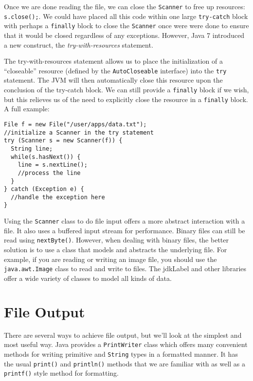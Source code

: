 Once we are done reading the file, we can close the 
\texttt{Scanner} to free up resources:
\texttt{s.close();}.  We could have placed
all this code within one large \texttt{try-catch}
block with perhaps a \texttt{finally} block
to close the \texttt{Scanner} once were were
done to ensure that it would be closed regardless of
any exceptions.  However, Java 7 introduced a new 
construct, the \emph{try-with-resources} statement.

The  try-with-resources statement 
allows us to place
the initialization of a ``closeable'' resource (defined
by the \texttt{AutoCloseable} interface) into
the \texttt{try} statement.  The JVM will then
automatically close this resource upon the conclusion of
the try-catch block.  We can still provide
a \texttt{finally} block if we wish, but this 
relieves us of the need to explicitly close the resource
in a \texttt{finally} block.  A full example:

\begin{verbatim}
File f = new File("/user/apps/data.txt");
//initialize a Scanner in the try statement
try (Scanner s = new Scanner(f)) {
  String line;
  while(s.hasNext()) {
    line = s.nextLine();
	//process the line
  }
} catch (Exception e) {
  //handle the exception here
}
\end{verbatim}

Using the \texttt{Scanner} class to do file 
input offers a more abstract interaction with a file.  
It also uses a buffered input stream for performance.
Binary files can still be read using \texttt{nextByte()}.
However, when dealing with binary files, the better 
solution is to use a class that
models and abstracts the underlying file.  For example, 
if you are reading or writing an image file, you should
use the \texttt{java.awt.Image} class to
read and write to files.  The \gls{jdkLabel} and other
libraries offer a wide variety of classes to model all
kinds of data.

\section{File Output}

There are several ways to achieve file output, 
but we'll look at the simplest and most useful way.
Java provides a \texttt{PrintWriter} class 
which offers many convenient methods for writing primitive 
and \texttt{String} types in a formatted manner.
It has the usual \texttt{print()} and \texttt{println()}
methods that we are familiar with as well as a 
\texttt{printf()} style method for formatting.

